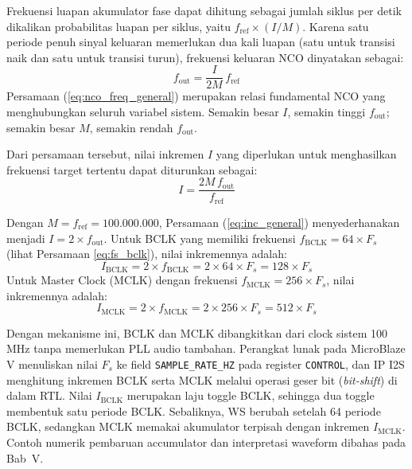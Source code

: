 Frekuensi luapan akumulator fase dapat dihitung sebagai jumlah siklus per detik dikalikan probabilitas luapan per siklus, yaitu $f_{\mathrm{ref}} \times (I / M)$. Karena satu periode penuh sinyal keluaran memerlukan dua kali luapan (satu untuk transisi naik dan satu untuk transisi turun), frekuensi keluaran NCO dinyatakan sebagai:
\begin{equation}
    f_{\mathrm{out}} = \frac{I}{2M} \, f_{\mathrm{ref}}
    \label{eq:nco_freq_general}
\end{equation}
Persamaan (\ref{eq:nco_freq_general}) merupakan relasi fundamental NCO yang menghubungkan seluruh variabel sistem. Semakin besar $I$, semakin tinggi $f_{\mathrm{out}}$; semakin besar $M$, semakin rendah $f_{\mathrm{out}}$.

Dari persamaan tersebut, nilai inkremen $I$ yang diperlukan untuk menghasilkan frekuensi target tertentu dapat diturunkan sebagai:
\begin{equation}
    I = \frac{2M \, f_{\mathrm{out}}}{f_{\mathrm{ref}}}
    \label{eq:inc_general}
\end{equation}

Dengan $M = f_{\mathrm{ref}} = 100.000.000$, Persamaan (\ref{eq:inc_general}) menyederhanakan menjadi $I = 2 \times f_{\mathrm{out}}$. Untuk BCLK yang memiliki frekuensi $f_{\mathrm{BCLK}} = 64 \times F_s$ (lihat Persamaan \ref{eq:fs_bclk}), nilai inkremennya adalah:
\begin{equation}
    I_{\mathrm{BCLK}} = 2 \times f_{\mathrm{BCLK}} = 2 \times 64 \times F_s = 128 \times F_s
    \label{eq:inc_bclk}
\end{equation}
Untuk Master Clock (MCLK) dengan frekuensi $f_{\mathrm{MCLK}} = 256 \times F_s$, nilai inkremennya adalah:
\begin{equation}
    I_{\mathrm{MCLK}} = 2 \times f_{\mathrm{MCLK}} = 2 \times 256 \times F_s = 512 \times F_s
    \label{eq:inc_mclk}
\end{equation}

Dengan mekanisme ini, BCLK dan MCLK dibangkitkan dari clock sistem 100 MHz tanpa memerlukan PLL audio tambahan. Perangkat lunak pada MicroBlaze V menuliskan nilai $F_s$ ke field \texttt{SAMPLE\_RATE\_HZ} pada register \texttt{CONTROL}, dan IP I2S menghitung inkremen BCLK serta MCLK melalui operasi geser bit (\textit{bit-shift}) di dalam RTL. Nilai $I_{\mathrm{BCLK}}$ merupakan laju toggle BCLK, sehingga dua toggle membentuk satu periode BCLK. Sebaliknya, WS berubah setelah 64 periode BCLK, sedangkan MCLK memakai akumulator terpisah dengan inkremen $I_{\mathrm{MCLK}}$. Contoh numerik pembaruan accumulator dan interpretasi waveform dibahas pada Bab~V.

